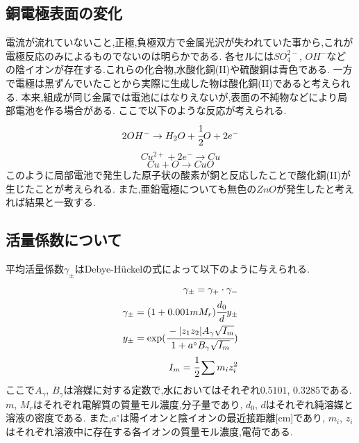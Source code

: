 \subsection{銅電極表面の変化}
電流が流れていないこと,正極,負極双方で金属光沢が失われていた事から,これが電極反応のみによるものでないのは明らかである.
各セルには$SO_4^{2-}$, $OH^{-}$などの陰イオンが存在する.これらの化合物,水酸化銅(II)や硫酸銅は青色である.
一方で電極は黒ずんでいたことから実際に生成した物は酸化銅(II)であると考えられる.
本来,組成が同じ金属では電池にはなりえないが,表面の不純物などにより局部電池を作る場合がある\cite{1961166}\cite{alma99403791704031}.
ここで以下のような反応が考えられる.
\begin{equation*}
  \label{equ:youkyoku}
  2OH^{-} \rightarrow H_2O + \cfrac{1}{2}O + 2e^{-}
\end{equation*}
\begin{equation*}
  \label{hukyoku}
  Cu^{2+} + 2e^{-} \rightarrow Cu
\end{equation*}
\begin{equation*}
  Cu + O \rightarrow CuO
\end{equation*}
このように局部電池で発生した原子状の酸素が銅と反応したことで酸化銅(II)が生じたことが考えられる.
また,亜鉛電極についても無色の$ZnO$が発生したと考えれば結果と一致する.
\subsection{活量係数について}
\label{sec:katuryo}
平均活量係数$\gamma_{\pm}$はDebye-H\"{u}ckelの式によって以下のように与えられる\cite{kiso}.
\begin{align}
  \label{equ:debye}
  \gamma_{\pm}=\gamma_{+}\cdot\gamma_{-}\\
  \label{equ:debye1}
  \gamma_{\pm}=(1+0.001mM_r)\cfrac{d_0}{d}y_{\pm}\\
  \label{equ:debye2}
  y_{\pm}=\exp(\cfrac{-|z_1z_2|A_{\gamma}\sqrt{I_m}}{1+a^{\circ}B_{\gamma}\sqrt{I_m}})\\
  \label{equ:debye3}
  I_m=\cfrac{1}{2}\sum m_iz_i^2
\end{align}
ここで$A_{\gamma}$, $B_{\gamma}$は溶媒に対する定数で,水においてはそれぞれ$0.5101$, $0.3285$である.
$m$, $M_r$はそれぞれ電解質の質量モル濃度,分子量であり, $d_0$, $d$はそれぞれ純溶媒と溶液の密度である.
また,$a^{\circ}$は陽イオンと陰イオンの最近接距離[cm]であり, $m_i$, $z_i$はそれぞれ溶液中に存在する各イオンの質量モル濃度,電荷である.

